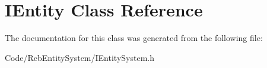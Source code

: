 \hypertarget{class_i_entity}{}\section{I\+Entity Class Reference}
\label{class_i_entity}


The documentation for this class was generated from the following file\+:\begin{DoxyCompactItemize}
\item 
Code/\+Reb\+Entity\+System/I\+Entity\+System.\+h\end{DoxyCompactItemize}
